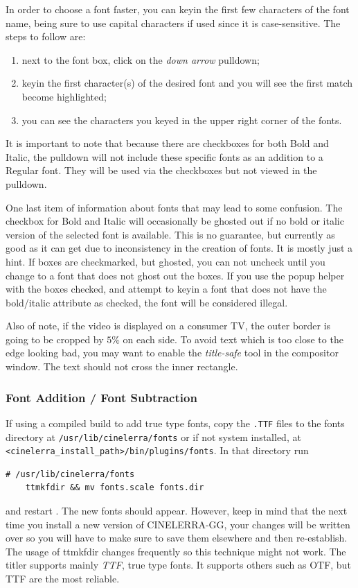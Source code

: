 In order to choose a font faster, you can keyin the first few characters of the font name, being sure to use capital characters if used since it is case-sensitive. The steps to follow are:

\begin{enumerate}
    \item next to the font box, click on the \textit{down arrow} pulldown;
    \item keyin the first character(s) of the desired font and you will see the first match become highlighted;
    \item you can see the characters you keyed in the upper right corner of the fonts.
\end{enumerate}
It is important to note that because there are checkboxes for both Bold and Italic, the pulldown will not include these specific fonts
as an addition to a Regular font.  They will be used via the checkboxes but not viewed in the pulldown.

One last item of information about fonts that may lead to some confusion. The checkbox for Bold and Italic will occasionally be ghosted out if no bold or italic version of the selected font is available. This is no guarantee, but currently as good as it can get due to inconsistency in the creation of fonts. It is mostly just a hint. If boxes are checkmarked, but ghosted, you can not uncheck until you change to a font that does not ghost out the boxes. If you use the popup helper with the boxes checked, and attempt to keyin a font that does not have the bold/italic attribute as checked, the font will be considered illegal.

Also of note, if the video is displayed on a consumer TV, the outer border is going to be cropped by $5\%$ on each side. To avoid text which is too close to the edge looking bad, you may want to enable the \textit{title-safe} tool in the compositor window. The text should not cross the inner rectangle.

\subsubsection*{Font Addition / Font Subtraction}%
\label{ssub:font_addition_subtraction}

If using a compiled build to add true type fonts, copy the \texttt{.TTF} files to the fonts directory at \texttt{/usr/lib/cinelerra/fonts}
or if not system installed, at \texttt{<cinelerra\_install\_path>/bin/plug\-ins/fonts}. In that directory run
\vspace{1ex}
\begin{lstlisting}[style=sh]
    # /usr/lib/cinelerra/fonts
    ttmkfdir && mv fonts.scale fonts.dir
\end{lstlisting}
and restart \CGG{}. The new fonts should appear. However, keep in mind that the next
time you install a new version of CINELERRA-GG, your changes will be written over so
you will have to make sure to save them elsewhere and then re-establish.
The usage of ttmkfdir changes frequently so this technique might not work.  The titler supports mainly \textit{TTF}, true type fonts. It supports others such as OTF, but TTF are the most reliable. 

